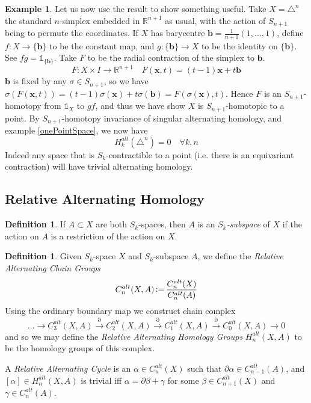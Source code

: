 \documentclass[11pt,a4paper,twoside]{article}
\theoremstyle{plain}
\theoremstyle{definition}
\newtheorem{defn}[thm]{Definition}
\theoremstyle{definition}
\theoremstyle{definition}
\theoremstyle{definition}
\newtheorem{example}[thm]{Example}
\theoremstyle{definition}
\DeclareMathOperator{\coloneqq}{\vcentcolon=}
\begin{document}
\vspace{2mm}
\begin{example}
\label{ex:AltHomOfDiscIsTrivial}
Let us now use the result to show something useful. Take $X=\triangle^n$ the standard $n$-simplex embedded in $\mathbb{R}^{n\!+\!1}$ as usual, with the action of $S_{n\!+\!1}$ being to permute the coordinates. If $X$ has barycentre $\mathbf{b}=\frac1{n+1}(1,\dots,1)$, define $f\!:\!X\!\longrightarrow\!\{\mathbf{b}\}$ to be the constant map, and $g\!:\!\{\mathbf{b}\}\!\longrightarrow\!X$ to be the identity on $\{\mathbf{b}\}$. See $fg=\mathbb{1}_{\{\mathbf{b}\}}$. Take $F$ to be the radial contraction of the simplex to $\mathbf{b}$.
$$F\!:\!X\!\times\!I\!\longrightarrow\!\mathbb{R}^{n\!+\!1} \quad F(\mathbf{x},t)=(t-1)\mathbf{x} + t\mathbf{b}$$
$\mathbf{b}$ is fixed by any $\sigma\in S_{n\!+\!1}$, so we have $\sigma(F(\mathbf{x},t))=(t\!-\!1)\sigma(\mathbf{x})\!+\!t\sigma(\mathbf{b})=F(\sigma(\mathbf{x}),t)$. Hence $F$ is an $S_{n\!+\!1}$-homotopy from $\mathbb{1}_X$ to $gf$, and thus we have show $X$ is $S_{n\!+\!1}$-homotopic to a point. By $S_{n\!+\!1}$-homotopy invariance of singular alternating homology, and example \ref{onePointSpace}, we now have
$$H_k^{alt}(\triangle^n)=0\quad \forall k,n$$
Indeed any space that is $S_k$-contractible to a point (i.e. there is an equivariant contraction) will have trivial alternating homology.
\end{example}

\subsection{Relative Alternating Homology}
\label{Sec_AlternatingRelativeHomology}
\begin{defn}
If $A\subset X$ are both $S_k$-spaces, then $A$ is an \emph{$S_k$-subspace} of $X$ if the action on $A$ is a restriction of the action on $X$.
\end{defn}
\begin{defn}
Given $S_k$-space $X$ and $S_k$-subspace $A$, we define the \emph{Relative Alternating Chain Groups}
$$C_n^{alt}(X,A)\coloneqq\frac{C_n^{alt}(X)}{C_n^{alt}(A)}$$
Using the ordinary boundary map we construct chain complex
$$\dots\longrightarrow C_3^{alt}(X,A)\overset\partial\longrightarrow C_2^{alt}(X,A)\overset\partial\longrightarrow C_1^{alt}(X,A)\overset\partial\longrightarrow C_0^{alt}(X,A)\longrightarrow 0$$
and so we may define the \emph{Relative Alternating Homology Groups} ${H_n^{alt}(X,A)}$ to be the homology groups of this complex.
\end{defn}
A \emph{Relative Alternating Cycle} is an $\alpha\in C_n^{alt}(X)$ such that $\partial\alpha\in C_{n\!-\!1}^{alt}(A)$, and $[\alpha]\in H_n^{alt}(X,A)$ is trivial iff $\alpha = \partial\beta\!+\!\gamma$ for some $\beta\in C_{n\!+\!1}^{alt}(X)$ and $\gamma\in C_n^{alt}(A)$.
\end{document}
